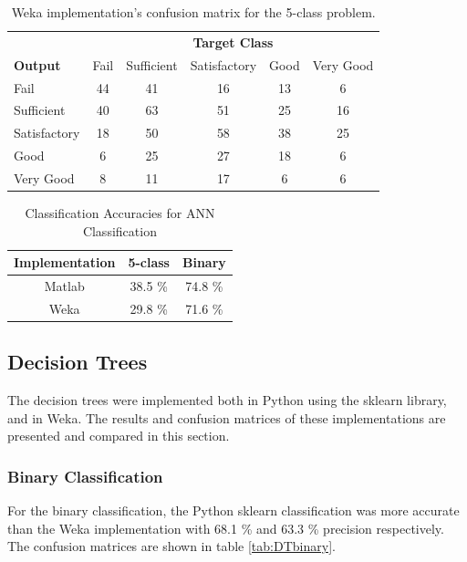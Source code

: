 \begin{table}[h!]
  \centering
  \begin{tabular}{l|ccccc}
    & \multicolumn{5}{c}{\textbf{Target Class}} \\
    \textbf{Output} & Fail & Sufficient & Satisfactory & Good & Very Good\\ \hline
    Fail & 44 & 41 & 16 & 13 & 6\\
    Sufficient & 40 & 63 & 51 & 25 & 16\\
    Satisfactory & 18 & 50 & 58 & 38 & 25\\
    Good & 6 & 25 & 27 & 18 & 6\\
    Very Good & 8 & 11 & 17 & 6 & 6\\
  \end{tabular}
  \caption{Weka implementation's confusion matrix for the 5-class problem.}
  \label{tab:table1}
\end{table}

\begin{table}[h!]
  \centering
  \begin{tabular}{ccc}
  \hline
    \textbf{Implementation} & \textbf{5-class} & \textbf{Binary} \\
    \hline
    Matlab &  38.5 \%  & 74.8 \%  \\
    Weka  & 29.8 \% & 71.6 \%  \\
    \hline
  \end{tabular}
  \caption{Classification Accuracies for ANN Classification}
  \label{tab:table1}
\end{table}

\subsection{Decision Trees}

The decision trees were implemented both in Python using the sklearn library, and in Weka. The results and confusion matrices of these implementations are presented and compared in this section.

\subsubsection{Binary Classification}
For the binary classification, the Python sklearn classification was more accurate than the Weka implementation with 68.1 \% and 63.3 \% precision respectively. The confusion matrices are shown in table \ref{tab:DTbinary}.

